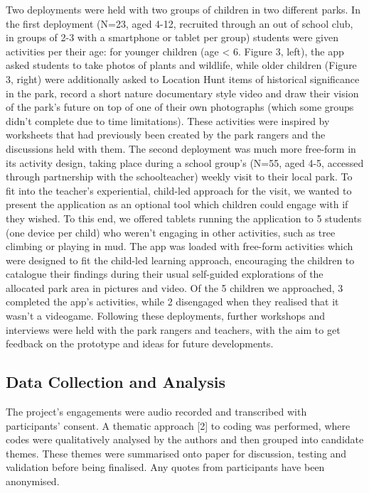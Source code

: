 Two deployments were held with two groups of children in two different parks. In the first deployment (N=23, aged 4-12, recruited through an out of school club, in groups of 2-3 with a smartphone or tablet per group) students were given activities per their age: for younger children (age < 6. Figure 3, left), the app asked students to take photos of plants and wildlife, while older children (Figure 3, right) were additionally asked to Location Hunt items of historical significance in the park, record a short nature documentary style video and draw their vision of the park’s future on top of one of their own photographs (which some groups didn’t complete due to time limitations). These activities were inspired by worksheets that had previously been created by the park rangers and the discussions held with them. 
The second deployment was much more free-form in its activity design, taking place during a school group’s (N=55, aged 4-5, accessed through partnership with the schoolteacher) weekly visit to their local park. To fit into the teacher’s experiential, child-led approach for the visit, we wanted to present the application as an optional tool which children could engage with if they wished. To this end, we offered tablets running the application to 5 students (one device per child) who weren’t engaging in other activities, such as tree climbing or playing in mud. The app was loaded with free-form activities which were designed to fit the child-led learning approach, encouraging the children to catalogue their findings during their usual self-guided explorations of the allocated park area in pictures and video. Of the 5 children we approached, 3 completed the app’s activities, while 2 disengaged when they realised that it wasn’t a videogame.
Following these deployments, further workshops and interviews were held with the park rangers and teachers, with the aim to get feedback on the prototype and ideas for future developments.

\subsection{Data Collection and Analysis}

The project’s engagements were audio recorded and transcribed with participants’ consent. A thematic approach [2] to coding was performed, where codes were qualitatively analysed by the authors and then grouped into candidate themes. These themes were summarised onto paper for discussion, testing and validation before being finalised. Any quotes from participants have been anonymised.

